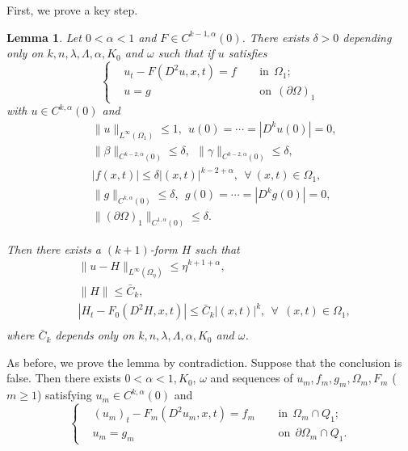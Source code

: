 \documentclass[preprint,12pt]{elsarticle}
\newtheorem{lemma}[theorem]{Lemma}
\theoremstyle{definition}
\theoremstyle{remark}
\numberwithin{equation}{section}
\begin{document}
First, we prove a key step.
\begin{lemma}\label{L.Cka.2}
Let $0<\alpha<1$ and $F\in C^{k-1,\alpha}(0)$. There exists $\delta>0$ depending only on $k,n,\lambda,\Lambda,\alpha,K_0$ and $\omega$ such that if $u$ satisfies
\begin{equation*}
\left\{\begin{aligned}
&u_t-F(D^2u,x,t)=f&& ~~\mbox{in}~~\Omega_1;\\
&u=g&& ~~\mbox{on}~~(\partial \Omega)_1
\end{aligned}\right.
\end{equation*}
with $u\in C^{k,\alpha}(0)$ and
\begin{equation*}
  \begin{aligned}
    &\|u\|_{L^{\infty}(\Omega_1)}\leq 1,~~ u(0)=\cdots=|D^ku(0)|=0,\\
    &\|\beta\|_{C^{k-2,\alpha}(0)}\leq \delta,~~
    \|\gamma\|_{C^{k-2,\alpha}(0)}\leq \delta,\\
    &|f(x,t)|\leq \delta|(x,t)|^{k-2+\alpha},~~\forall ~(x,t)\in \Omega_1,\\
    &\|g\|_{C^{k,\alpha}(0)}\leq \delta,~~g(0)=\cdots=|D^kg(0)|=0,\\
    &\|(\partial \Omega)_1\|_{C^{1,\alpha}(0)} \leq \delta.
  \end{aligned}
\end{equation*}

Then there exists a $(k+1)$-form $H$ such that
\begin{equation*}
  \begin{aligned}
    & \|u-H\|_{L^{\infty}(\Omega_{\eta})}\leq \eta^{k+1+\alpha},\\
    &\|H\|\leq \bar{C}_k,\\
    &\left|H_t-F_0(D^2H,x,t)\right|\leq \bar{C}_k|(x,t)|^{k},~~\forall~~(x,t)\in \Omega_1,\\
  \end{aligned}
\end{equation*}
where $\bar{C}_k$ depends only on $k,n,\lambda,\Lambda,\alpha,K_0$ and $\omega$.
\end{lemma}
\proof As before, we prove the lemma by contradiction. Suppose that the conclusion is false. Then there exists $0<\alpha<1,K_0$, $\omega$ and sequences of $u_m,f_m,g_m,\Omega_m,F_m$ ($m\geq 1$) satisfying $u_m\in C^{k,\alpha}(0)$ and
\begin{equation*}
\left\{\begin{aligned}
&(u_m)_t-F_m(D^2u_m,x,t)=f_m&& ~~\mbox{in}~~\Omega_m\cap Q_1;\\
&u_m=g_m&& ~~\mbox{on}~~\partial \Omega_m\cap Q_1.
\end{aligned}\right.
\end{equation*}
\end{document}
